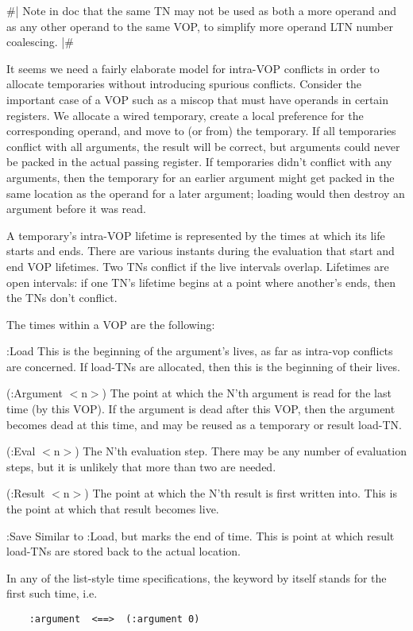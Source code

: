 \#|
Note in doc that the same TN may not be used as both a more operand and as any
other operand to the same VOP, to simplify more operand LTN number coalescing.
|\#

It seems we need a fairly elaborate model for intra-VOP conflicts in order to
allocate temporaries without introducing spurious conflicts.  Consider the
important case of a VOP such as a miscop that must have operands in certain
registers.  We allocate a wired temporary, create a local preference for the
corresponding operand, and move to (or from) the temporary.  If all temporaries
conflict with all arguments, the result will be correct, but arguments could
never be packed in the actual passing register.  If temporaries didn't conflict
with any arguments, then the temporary for an earlier argument might get packed
in the same location as the operand for a later argument; loading would then
destroy an argument before it was read.

A temporary's intra-VOP lifetime is represented by the times at which its life
starts and ends.  There are various instants during the evaluation that start
and end VOP lifetimes.  Two TNs conflict if the live intervals overlap.
Lifetimes are open intervals: if one TN's lifetime begins at a point where
another's ends, then the TNs don't conflict.

The times within a VOP are the following:

:Load
    This is the beginning of the argument's lives, as far as intra-vop
    conflicts are concerned.  If load-TNs are allocated, then this is the
    beginning of their lives.

(:Argument $<$n$>$)
    The point at which the N'th argument is read for the last time (by this
    VOP).  If the argument is dead after this VOP, then the argument becomes
    dead at this time, and may be reused as a temporary or result load-TN.

(:Eval $<$n$>$)
    The N'th evaluation step.  There may be any number of evaluation steps, but
    it is unlikely that more than two are needed.

(:Result $<$n$>$) 
    The point at which the N'th result is first written into.  This is the
    point at which that result becomes live.

:Save
    Similar to :Load, but marks the end of time.  This is point at which result
    load-TNs are stored back to the actual location.

In any of the list-style time specifications, the keyword by itself stands for
the first such time, i.e.
\begin{verbatim}
    :argument  <==>  (:argument 0)
\end{verbatim}

